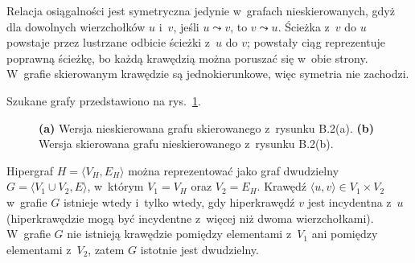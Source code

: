 Relacja osiągalności jest symetryczna jedynie w~grafach nieskierowanych, gdyż dla dowolnych wierzchołków $u$ i~$v$, jeśli $u\leadsto v$, to $v\leadsto u$.
Ścieżka z~$v$ do $u$ powstaje przez lustrzane odbicie ścieżki z~$u$ do $v$; powstały ciąg reprezentuje poprawną ścieżkę, bo każdą krawędzią można poruszać się w~obie strony.
W~grafie skierowanym krawędzie są jednokierunkowe, więc symetria nie zachodzi.

\exercise %
Szukane grafy przedstawiono na rys.\ \ref{fig:B.4-5}.
\begin{figure}[!ht]
	\centering 
	\caption{{\sffamily\bfseries(a)} Wersja nieskierowana grafu skierowanego z~rysunku B.2(a).
{\sffamily\bfseries(b)} Wersja skierowana grafu nieskierowanego z~rysunku B.2(b).} \label{fig:B.4-5}
\end{figure}

\exercise %
Hipergraf $H=\langle V_H,E_H\rangle$ można reprezentować jako graf dwudzielny $G=\langle V_1\cup V_2,E\rangle$, w~którym $V_1=V_H$ oraz $V_2=E_H$.
Krawędź $\langle u,v\rangle\in V_1\times V_2$ w~grafie $G$ istnieje wtedy i~tylko wtedy, gdy hiperkrawędź $v$ jest incydentna z~$u$ (hiperkrawędzie mogą być incydentne z~więcej niż dwoma wierzchołkami).
W~grafie $G$ nie istnieją krawędzie pomiędzy elementami z~$V_1$ ani pomiędzy elementami z~$V_2$, zatem $G$ istotnie jest dwudzielny.
